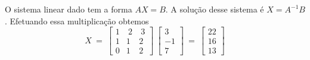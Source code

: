 \begin{solution}
\medskip
O sistema linear dado tem a forma $AX=B$. A solução desse sistema é $X = A^{-1}B$. Efetuando essa multiplicação obtemos
$$X\ =\ \left[ \begin{array}{rrr}
 1 & \  2 & \ 3  \\
 1 &    1 &   2  \\
 0 &    1 &   2 
\end{array} \right] \
\left[\begin{array}{rrr} 3 \\ -1 \\ 7 \end{array}\right]\ =\ 
\left[\begin{array}{rrr} 22 \\ 16 \\ 13 \end{array}\right]$$
\end{solution}

